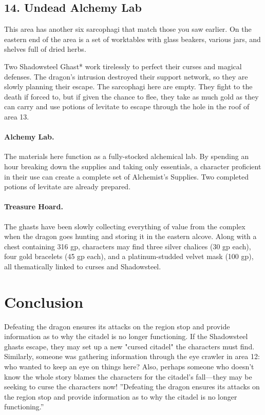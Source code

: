 \documentclass[10pt,a4paper,twoside,twocolumn,openany,bg=print,nodeprecatedcode]{dndbook}
\begin{document}
\subsection{14. Undead Alchemy Lab}
\begin{DndReadAloud}{}
This area has another six sarcophagi that match those you saw earlier. On the eastern end of the area is a set of worktables with glass beakers, various jars, and shelves full of dried herbs.
\end{DndReadAloud}

Two Shadowsteel Ghast* work tirelessly to perfect their curses and magical defenses. The dragon's intrusion destroyed their support network, so they are slowly planning their escape. The sarcophagi here are empty. They fight to the death if forced to, but if given the chance to flee, they take as much gold as they can carry and use potions of levitate to escape through the hole in the roof of area 13.
\paragraph{Alchemy Lab.}
The materials here function as a fully-stocked alchemical lab. By spending an hour breaking down the supplies and taking only essentials, a character proficient in their use can create a complete set of Alchemist's Supplies. Two completed potions of levitate are already prepared.
\paragraph{Treasure Hoard.}
The ghasts have been slowly collecting everything of value from the complex when the dragon goes hunting and storing it in the eastern alcove. Along with a chest containing 316 gp, characters may find three silver chalices (30 gp each), four gold bracelets (45 gp each), and a platinum-studded velvet mask (100 gp), all thematically linked to curses and Shadowsteel.
\section{Conclusion}
Defeating the dragon ensures its attacks on the region stop and provide information as to why the citadel is no longer functioning. If the Shadowsteel ghasts escape, they may set up a new "cursed citadel" the characters must find. Similarly, someone was gathering information through the eye crawler in area 12: who wanted to keep an eye on things here? Also, perhaps someone who doesn't know the whole story blames the characters for the citadel's fall—they may be seeking to curse the characters now!
\DndQuote%
{}
{''Defeating the dragon ensures its attacks on the region stop and provide information as to why the citadel is no longer functioning.''}
{}
\end{document}
